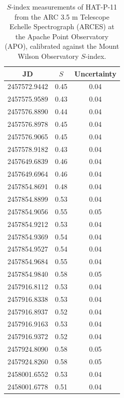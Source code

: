 \begin{subappendices}
\begin{table}[H]
\begin{center}
\caption{$S$-index measurements of HAT-P-11 from the ARC 3.5 m Telescope Echelle Spectrograph (ARCES) at the Apache Point Observatory (APO), calibrated against the Mount Wilson Observatory $S$-index. \label{tab:sind}}
\begin{tabular}{ccc}
JD & $S$ & Uncertainty \\ \hline
2457572.9442 & 0.45 & 0.04 \\
2457575.9589 & 0.43 & 0.04 \\
2457576.8890 & 0.44 & 0.04 \\
2457576.8978 & 0.45 & 0.04 \\
2457576.9065 & 0.45 & 0.04 \\
2457578.9182 & 0.43 & 0.04 \\
2457649.6839 & 0.46 & 0.04 \\
2457649.6964 & 0.46 & 0.04 \\
2457854.8691 & 0.48 & 0.04 \\
2457854.8899 & 0.53 & 0.04 \\
2457854.9056 & 0.55 & 0.05 \\
2457854.9212 & 0.53 & 0.04 \\
2457854.9369 & 0.54 & 0.04 \\
2457854.9527 & 0.54 & 0.04 \\
2457854.9684 & 0.55 & 0.04 \\
2457854.9840 & 0.58 & 0.05 \\
2457916.8112 & 0.53 & 0.04 \\
2457916.8338 & 0.53 & 0.04 \\
2457916.8937 & 0.52 & 0.04 \\
2457916.9163 & 0.53 & 0.04 \\
2457916.9372 & 0.52 & 0.04 \\
2457924.8090 & 0.58 & 0.05 \\
2457924.8260 & 0.58 & 0.05 \\
2458001.6552 & 0.53 & 0.04 \\
2458001.6778 & 0.51 & 0.04 \\
\end{tabular}
\end{center}
\end{table}

\end{subappendices}







% 
